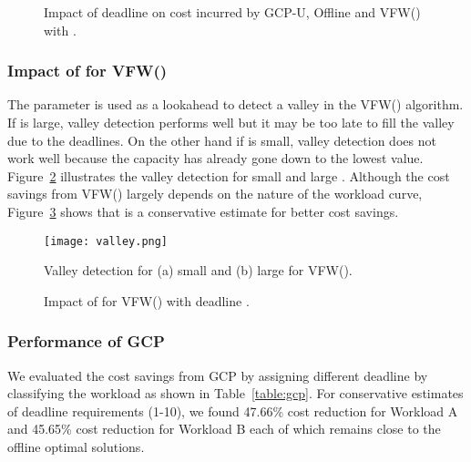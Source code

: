 \documentclass[10pt,conference,compsocconf,letterpaper]{IEEEtran}
\begin{document}
\begin{figure}[!t]
\centerline{
\hfil
{}}
\caption{Impact of deadline on cost incurred by GCP-U, Offline and VFW() with . }
\label{fig:deadline}
\end{figure}




\subsubsection*{Impact of  for VFW()}
The parameter  is used as a lookahead to detect a valley in the VFW() algorithm. If  is large, valley detection performs well but it may be too late to fill the valley due to the deadlines. On the other hand if  is small, valley detection does not work well because the capacity has already gone down to the lowest value. Figure~\ref{fig:valleydetect} illustrates the valley detection for small  and large . Although the cost savings from VFW() largely depends on the nature of the workload curve, Figure~\ref{fig:delta} shows that  is a conservative estimate for better cost savings.



\begin{figure}[!t]
\begin{center}
\texttt{[image: valley.png]}
\caption{Valley detection for (a) small  and (b) large  for VFW().}
\label{fig:valleydetect}
\end{center}
\end{figure}


\begin{figure}[!t]
\centerline{
\hfil
{}}
\caption{Impact of  for VFW() with deadline . }
\label{fig:delta}
\end{figure}


\subsubsection*{Performance of GCP}
We evaluated the cost savings from GCP by assigning different deadline by classifying the workload as shown in Table~\ref{table:gcp}. For conservative estimates of deadline requirements (1-10), we found 47.66\% cost reduction for Workload A and 45.65\% cost reduction for Workload B each of which remains close to the offline optimal solutions.
\end{document}
